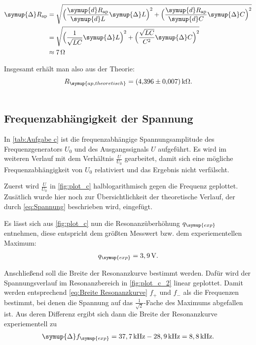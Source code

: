 \begin{align*}
  \label{eqn:Fehler Rap}
  \symup{\Delta} R_{\text{ap}} &= \sqrt{\Bigl(\frac{\symup{d}R_{\text{ap}}}{\symup{d}L}\symup{\Delta} L \Bigr)^2+\Bigl(\frac{\symup{d}R_{\text{ap}}}{\symup{d}C}\symup{\Delta} C\Bigr)^2} \\
  &= \sqrt{\Bigl(\frac{1}{\sqrt{LC}}\symup{\Delta} L\Bigr)^2+\Bigl(\frac{\sqrt{LC}}{C^2}\symup{\Delta} C\Bigr)^2} \\
  &\approx 7\,\unit{\ohm}
\end{align*}

Insgesamt erhält man also aus der Theorie:
\begin{gather*}
  R_{\symup{ap, theoretisch}} = \qty{4,396+-0.007}{\kilo\ohm}. \\ \notag
\end{gather*}

\subsection{Frequenzabhängigkeit der Spannung}
\label{sec:Frequenzabhängigkeit der Spannung}

In \autoref{tab:Aufgabe c} ist die frequenzabhängige Spannungsamplitude des Frequenzgenerators $U_0$ und des Ausgangssignals $U$
aufgeführt. Es wird im weiteren Verlauf mit dem Verhältnis $\frac{U}{U_{0}}$ gearbeitet, damit sich eine mögliche
Frequenzabhängigkeit von $U_0$ relativiert und das Ergebnis nicht verfälscht. 

Zuerst wird $\frac{U}{U_{0}}$ in \autoref{fig:plot_c} halblogarithmisch gegen die Frequenz geplottet.
Zusätlich wurde hier noch zur Übersichtlichkeit der theoretische Verlauf, der durch \eqref{eq:Spannung} beschrieben wird, eingefügt.

Es lässt sich aus \autoref{fig:plot_c} nun die Resonanzüberhöhung $q_{\symup{exp}}$ entnehmen, diese entspricht dem größten Messwert bzw.
dem experiementellen Maximum:
\begin{gather*}
  q_{\symup{exp}} = 3,9\,\unit{\volt}. \notag
\end{gather*}

Anschließend soll die Breite der Resonanzkurve bestimmt werden.
Dafür wird der Spannungsverlauf im Resonanzbereich in \autoref{fig:plot_c_2} linear geplottet.
Damit werden entsprechend \eqref{eq:Breite Resonanzkurve} $f_+$ und $f_-$ als die Frequenzen bestimmt, bei denen
die Spannung auf das  $\frac{1}{\sqrt{2}}$-Fache des Maximums abgefallen ist.
Aus deren Differenz ergibt sich dann die Breite der Resonanzkurve experiementell zu
\begin{gather*}
  \symup{\Delta}f_{\symup{exp}} = 37,7\,\unit{\kilo\hertz} - 28,9\,\unit{\kilo\hertz} = 8,8\,\unit{\kilo\hertz}. \notag
\end{gather*}

